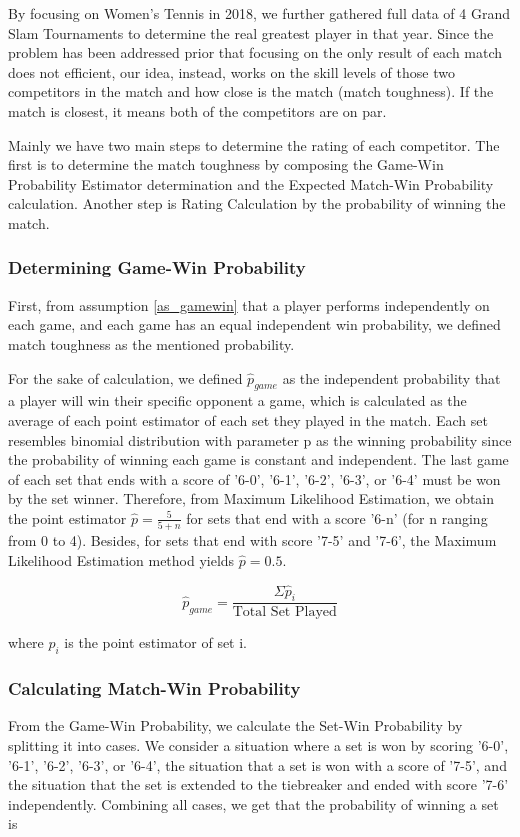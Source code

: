 By focusing on Women's Tennis in 2018, we further gathered full data of 4 Grand Slam Tournaments to determine the real greatest player in that year. Since the problem has been addressed prior that focusing on the only result of each match does not efficient, our idea, instead, works on the skill levels of those two competitors in the match and how close is the match (match toughness). If the match is closest, it means both of the competitors are on par. %

Mainly we have two main steps to determine the rating of each competitor. The first is to determine the match toughness by composing the Game-Win Probability Estimator determination and the Expected Match-Win Probability calculation. Another step is Rating Calculation by the probability of winning the match. %

\subsubsection{Determining Game-Win Probability}
First, from assumption \ref{as_gamewin} that a player performs independently on each game, and each game has an equal independent win probability, we defined match toughness as the mentioned probability. %

For the sake of calculation, we defined $\hat{p}_{game}$ as the independent probability that a player will win their specific opponent a game, which is calculated as the average of each point estimator of each set they played in the match. Each set resembles binomial distribution with parameter p as the winning probability since the probability of winning each game is constant and independent. The last game of each set that ends with a score of '6-0', '6-1', '6-2', '6-3', or '6-4' must be won by the set winner. Therefore, from Maximum Likelihood Estimation, we obtain the point estimator $\hat{p} = \frac{5}{5+n}$ for sets that end with a score '6-n' (for n ranging from 0 to 4). Besides, for sets that end with score '7-5' and '7-6', the Maximum Likelihood Estimation method yields $\hat{p} = 0.5$. %

$$\hat{p}_{game} = \frac{\Sigma \hat{p}_i}{\text {Total Set Played}}$$

\noindent where $\hat{p}_i$ is the point estimator of set i.

\subsubsection{Calculating Match-Win Probability}
From the Game-Win Probability, we calculate the Set-Win Probability by splitting it into cases. We consider a situation where a set is won by scoring '6-0', '6-1', '6-2', '6-3', or '6-4', the situation that a set is won with a score of '7-5', and the situation that the set is extended to the tiebreaker and ended with score '7-6' independently. Combining all cases, we get that the probability of winning a set is %


